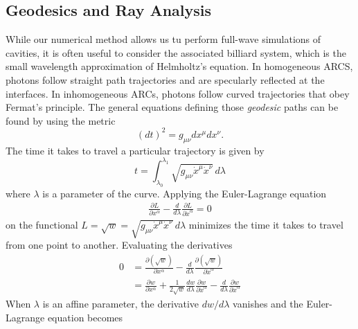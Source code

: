 \subsection{Geodesics and Ray Analysis}
While our numerical method allows us tu perform full-wave
simulations of cavities, it is often useful to consider the associated
billiard system, which is the small wavelength approximation of 
Helmholtz's equation. In homogeneous ARCS, photons follow straight path
trajectories and are specularly reflected at the interfaces. In inhomogeneous
ARCs, photons follow curved trajectories that obey Fermat's principle. 
The general equations defining those \textit{geodesic} paths can be found
by using the metric
  \begin{equation}
   (dt)^2=g_{\mu\nu}dx^\mu dx^\nu. 
  \end{equation}
The time it takes to travel a particular trajectory is given by
  \begin{equation}
   t = \int_{\lambda_0}^{\lambda_1} \sqrt{g_{\mu\nu}\dot{x}^\mu\dot{x}^\nu}\,d\lambda
  \end{equation}
where $\lambda$ is a parameter of the curve. Applying the Euler-Lagrange
equation 
  \begin{align}
   \frac{\partial L}{\partial x^\alpha}-\frac{d}{d\lambda}\frac{\partial L}{\partial\dot{x}^\alpha}=0
  \end{align}
on the functional $L=\sqrt{w}=\sqrt{g_{\mu\nu}\dot{x}^\mu\dot{x}^\nu}\,d\lambda$ minimizes the time it takes to travel
from one point to another. Evaluating the derivatives
  \begin{align*}
  0	&=\frac{\partial\left(\sqrt{w}\right)}{\partial x^\alpha}-\frac{d}{d\lambda}\frac{\partial\left(\sqrt{w}\right)}{\partial\dot{x}^\alpha}	\\
  {}	&=\frac{\partial w}{\partial x^\alpha}+\frac{1}{2\sqrt{w}}\frac{dw}{d\lambda}\frac{\partial w}{\partial\dot{x}^\alpha}-\frac{d}{d\lambda}\frac{\partial w}{\partial\dot{x}^\alpha}
  \end{align*}
When $\lambda$ is an affine parameter, the derivative $dw/d\lambda$ vanishes \cite{TOP2005,SCH2009}
and the Euler-Lagrange equation becomes
